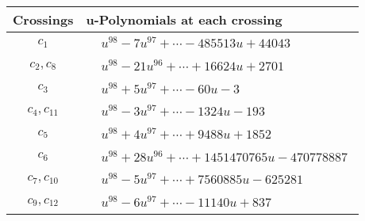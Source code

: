 \documentclass[1p]{elsarticle_modified}
\theoremstyle{definition}
\begin{document}
\begin{tabular}{m{50pt}|m{274pt}}
Crossings & \hspace{64pt}u-Polynomials at each crossing \\
\hline $$\begin{aligned}c_{1}\end{aligned}$$&$\begin{aligned}
&u^{98}-7 u^{97}+\cdots-485513 u+44043
\end{aligned}$\\
\hline $$\begin{aligned}c_{2},c_{8}\end{aligned}$$&$\begin{aligned}
&u^{98}-21 u^{96}+\cdots+16624 u+2701
\end{aligned}$\\
\hline $$\begin{aligned}c_{3}\end{aligned}$$&$\begin{aligned}
&u^{98}+5 u^{97}+\cdots-60 u-3
\end{aligned}$\\
\hline $$\begin{aligned}c_{4},c_{11}\end{aligned}$$&$\begin{aligned}
&u^{98}-3 u^{97}+\cdots-1324 u-193
\end{aligned}$\\
\hline $$\begin{aligned}c_{5}\end{aligned}$$&$\begin{aligned}
&u^{98}+4 u^{97}+\cdots+9488 u+1852
\end{aligned}$\\
\hline $$\begin{aligned}c_{6}\end{aligned}$$&$\begin{aligned}
&u^{98}+28 u^{96}+\cdots+1451470765 u-470778887
\end{aligned}$\\
\hline $$\begin{aligned}c_{7},c_{10}\end{aligned}$$&$\begin{aligned}
&u^{98}-5 u^{97}+\cdots+7560885 u-625281
\end{aligned}$\\
\hline $$\begin{aligned}c_{9},c_{12}\end{aligned}$$&$\begin{aligned}
&u^{98}-6 u^{97}+\cdots-11140 u+837
\end{aligned}$\\
\hline
\end{tabular}\\~\\
\end{document}
